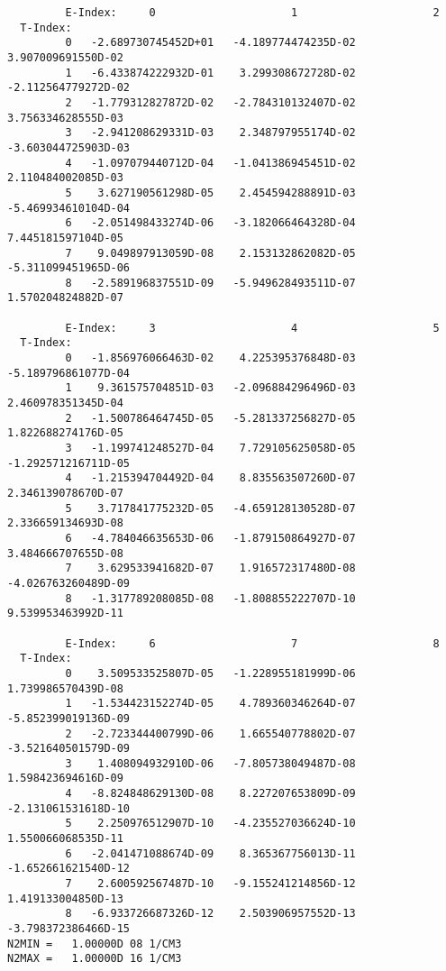 \documentclass[12pt,dvipdfmx]{article}
\begin{document}
{\begin{small}\begin{verbatim}
         E-Index:     0                     1                     2
  T-Index:
         0   -2.689730745452D+01   -4.189774474235D-02    3.907009691550D-02
         1   -6.433874222932D-01    3.299308672728D-02   -2.112564779272D-02
         2   -1.779312827872D-02   -2.784310132407D-02    3.756334628555D-03
         3   -2.941208629331D-03    2.348797955174D-02   -3.603044725903D-03
         4   -1.097079440712D-04   -1.041386945451D-02    2.110484002085D-03
         5    3.627190561298D-05    2.454594288891D-03   -5.469934610104D-04
         6   -2.051498433274D-06   -3.182066464328D-04    7.445181597104D-05
         7    9.049897913059D-08    2.153132862082D-05   -5.311099451965D-06
         8   -2.589196837551D-09   -5.949628493511D-07    1.570204824882D-07

         E-Index:     3                     4                     5
  T-Index:
         0   -1.856976066463D-02    4.225395376848D-03   -5.189796861077D-04
         1    9.361575704851D-03   -2.096884296496D-03    2.460978351345D-04
         2   -1.500786464745D-05   -5.281337256827D-05    1.822688274176D-05
         3   -1.199741248527D-04    7.729105625058D-05   -1.292571216711D-05
         4   -1.215394704492D-04    8.835563507260D-07    2.346139078670D-07
         5    3.717841775232D-05   -4.659128130528D-07    2.336659134693D-08
         6   -4.784046635653D-06   -1.879150864927D-07    3.484666707655D-08
         7    3.629533941682D-07    1.916572317480D-08   -4.026763260489D-09
         8   -1.317789208085D-08   -1.808855222707D-10    9.539953463992D-11

         E-Index:     6                     7                     8
  T-Index:
         0    3.509533525807D-05   -1.228955181999D-06    1.739986570439D-08
         1   -1.534423152274D-05    4.789360346264D-07   -5.852399019136D-09
         2   -2.723344400799D-06    1.665540778802D-07   -3.521640501579D-09
         3    1.408094932910D-06   -7.805738049487D-08    1.598423694616D-09
         4   -8.824848629130D-08    8.227207653809D-09   -2.131061531618D-10
         5    2.250976512907D-10   -4.235527036624D-10    1.550066068535D-11
         6   -2.041471088674D-09    8.365367756013D-11   -1.652661621540D-12
         7    2.600592567487D-10   -9.155241214856D-12    1.419133004850D-13
         8   -6.933726687326D-12    2.503906957552D-13   -3.798372386466D-15
N2MIN =   1.00000D 08 1/CM3
N2MAX =   1.00000D 16 1/CM3


\end{verbatim}
\end{small}}
\end{document}
